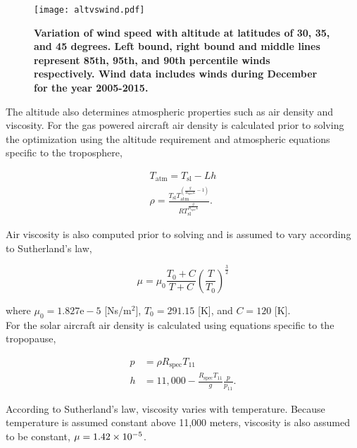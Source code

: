 \documentclass[]{aiaa-tc}%
\begin{document}
\begin{figure}[H]
	\begin{center}
	\texttt{[image: altvswind.pdf]}
    \caption{\textbf{Variation of wind speed with altitude at latitudes of 30, 35, and 45 degrees.  Left bound, right bound and middle lines represent 85th, 95th, and 90th percentile winds respectively. Wind data includes winds during December for the year 2005-2015.}}
	\label{f:altvswind}
	\end{center}
\end{figure}

The altitude also determines atmospheric properties such as air density and viscosity.  For the gas powered aircraft air density is calculated prior to solving the optimization using the altitude requirement and atmospheric equations specific to the troposphere,\cite{isaatm} 

\begin{align}
    \label{e:Talt}
    T_{\text{atm}} = T_{\text{sl}} - Lh \\
    \label{e:rhot}
    \rho = \frac{T_{\text{sl}}T_{\text{atm}}^{\left( \frac{g}{R_{\text{spec}}L} -1 \right)}}{R T_{\text{sl}}^{\frac{g}{R_{\text{spec}}L}}}.
\end{align}

Air viscosity is also computed prior to solving and is assumed to vary according to Sutherland's law,\cite{fluiddyhandbook}

\begin{equation}
    \label{e:sutherland}
    \mu = \mu_0 \frac{T_0 + C}{T+C} \left( \frac{T}{T_0} \right)^{\frac{3}{2}}
\end{equation}

where $\mu_0 = 1.827\text{e}-5$ [Ns/m$^2$], $T_0 = 291.15$ [K], and $C = 120$ [K]. \\

For the solar aircraft air density is calculated using equations specific to the tropopause,\cite{isaatm} 

\begin{align}
    \label{e:tropopress}
    p &= \rho R_{\text{spec}}T_{11} \\
    \label{e:tropoalt}
    h &= 11,000 - \frac{R_{\text{spec}}T_{11}}{g}\frac{p}{p_{11}}.
\end{align}

According to Sutherland's law\cite{fluiddyhandbook}, viscosity varies with temperature.  Because temperature is assumed constant above 11,000 meters\cite{isaatm}, viscosity is also assumed to be constant, $\mu=\num{1.42d-5}$. \\
\end{document}

